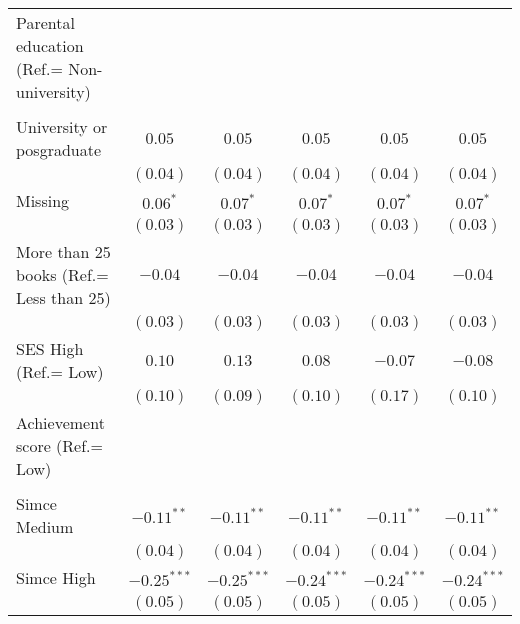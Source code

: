 \documentclass[
  12pt,
  letterpaper,
]{article}
\begin{document}
\begin{table}
{\begin{center}
{\begin{threeparttable}
\begin{tabular}{l c c c c c}
Parental education (Ref.= Non-university) &               &               &               &               &               \\
                                          &               &               &               &               &               \\
\quad University or posgraduate           & $0.05$        & $0.05$        & $0.05$        & $0.05$        & $0.05$        \\
                                          & $(0.04)$      & $(0.04)$      & $(0.04)$      & $(0.04)$      & $(0.04)$      \\
\quad Missing                             & $0.06^{*}$    & $0.07^{*}$    & $0.07^{*}$    & $0.07^{*}$    & $0.07^{*}$    \\
                                          & $(0.03)$      & $(0.03)$      & $(0.03)$      & $(0.03)$      & $(0.03)$      \\
More than 25 books (Ref.= Less than 25)   & $-0.04$       & $-0.04$       & $-0.04$       & $-0.04$       & $-0.04$       \\
                                          & $(0.03)$      & $(0.03)$      & $(0.03)$      & $(0.03)$      & $(0.03)$      \\
SES High (Ref.= Low)                      & $0.10$        & $0.13$        & $0.08$        & $-0.07$       & $-0.08$       \\
                                          & $(0.10)$      & $(0.09)$      & $(0.10)$      & $(0.17)$      & $(0.10)$      \\
Achievement score (Ref.= Low)             &               &               &               &               &               \\
                                          &               &               &               &               &               \\
\quad Simce Medium                        & $-0.11^{**}$  & $-0.11^{**}$  & $-0.11^{**}$  & $-0.11^{**}$  & $-0.11^{**}$  \\
                                          & $(0.04)$      & $(0.04)$      & $(0.04)$      & $(0.04)$      & $(0.04)$      \\
\quad Simce High                          & $-0.25^{***}$ & $-0.25^{***}$ & $-0.24^{***}$ & $-0.24^{***}$ & $-0.24^{***}$ \\
                                          & $(0.05)$      & $(0.05)$      & $(0.05)$      & $(0.05)$      & $(0.05)$      \\

\end{tabular}
\end{threeparttable}}
\end{center}}
\end{table}
\end{document}
